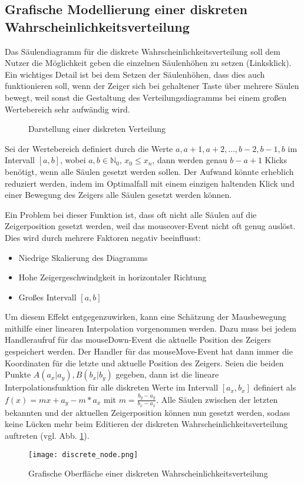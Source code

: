 \subsection{Grafische Modellierung einer diskreten Wahrscheinlichkeitsverteilung}

Das Säulendiagramm für die diskrete Wahrscheinlichkeitsverteilung soll dem Nutzer die Möglichkeit geben die einzelnen Säulenhöhen zu setzen (Linksklick). Ein wichtiges Detail ist bei dem Setzen der Säulenhöhen, dass dies auch funktionieren soll, wenn der Zeiger sich bei gehaltener Taste über mehrere Säulen bewegt, weil sonst die Gestaltung des Verteilungsdiagramms bei einem großen Wertebereich sehr aufwändig wird. 

\begin{figure}[H]
    \center
    \caption{Darstellung einer diskreten Verteilung}
\end{figure}

Sei der Wertebereich definiert durch die Werte $a,a+1,a+2,\dots,b-2,b-1,b$ im Intervall $[a,b]$, wobei $a,b \in\mathbb{N}_0$, $x_0 \le x_n$, dann werden genau $b-a+1$ Klicks benötigt, wenn alle Säulen gesetzt werden sollen. Der Aufwand könnte erheblich reduziert werden, indem im Optimalfall mit einem einzigen haltenden Klick und einer Bewegung des Zeigers alle Säulen gesetzt werden können.

Ein Problem bei dieser Funktion ist, dass oft nicht alle Säulen auf die Zeigerposition gesetzt werden, weil das mouseover-Event nicht oft genug auslöst. Dies wird durch mehrere Faktoren negativ beeinflusst:
\begin{itemize}
    \item Niedrige Skalierung des Diagramms
    \item Hohe Zeigergeschwindgkeit in horizontaler Richtung
    \item Großes Intervall $[a,b]$
 \end{itemize}

Um diesem Effekt entgegenzuwirken, kann eine Schätzung der Mausbewegung mithilfe einer linearen Interpolation vorgenommen werden. Dazu muss bei jedem Handleraufruf für das mouseDown-Event die aktuelle Position des Zeigers gespeichert werden. Der Handler für das mouseMove-Event hat dann immer die Koordinaten für die letzte und aktuelle Position des Zeigers. Seien die beiden Punkte $A(a_x|a_y), B(b_x|b_y)$ gegeben, dann ist die lineare Interpolationsfunktion für alle diskreten Werte im Intervall $[a_x,b_x]$ definiert als $f(x)=mx+a_y-m*a_x$ mit $m=\frac{b_y-a_y}{b_x-a_x}$. Alle Säulen zwischen der letzten bekannten und der aktuellen Zeigerposition können nun gesetzt werden, sodass keine Lücken mehr beim Editieren der diskreten Wahrscheinlichkeitsverteilung auftreten (vgl. Abb. \ref{fig:discretenode}).

\begin{figure}[H]
    \centering
    \texttt{[image: discrete\_node.png]}
    \caption{Grafische Oberfläche einer diskreten Wahrscheinlichkeitsverteilung}\label{fig:discretenode}
\end{figure}